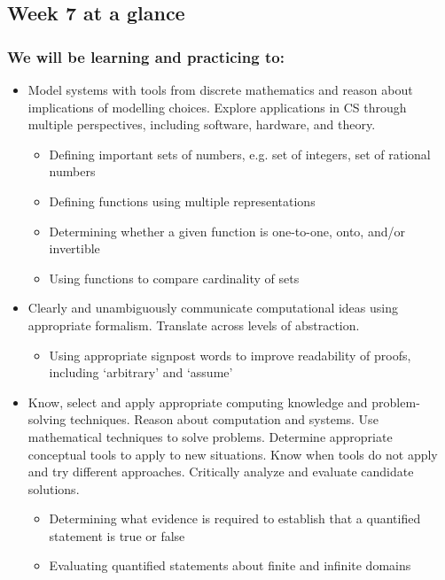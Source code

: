 \newpage

\subsection*{Week 7 at a glance}

\subsubsection*{We will be learning and practicing to:}
\begin{itemize}
\item Model systems with tools from discrete mathematics and reason about implications of modelling choices. Explore applications in CS through multiple perspectives, including software, hardware, and theory.
\begin{itemize}
    \item Defining important sets of numbers, e.g. set of integers, set of rational numbers
    \item Defining functions using multiple representations
    \item Determining whether a given function is one-to-one, onto, and/or invertible
    \item Using functions to compare cardinality of sets
\end{itemize}

\item Clearly and unambiguously communicate computational ideas using appropriate formalism. Translate across levels of abstraction.
\begin{itemize}
    \item Using appropriate signpost words to improve readability of proofs, including `arbitrary' and `assume'
\end{itemize}

\item Know, select and apply appropriate computing knowledge and problem-solving techniques. Reason about computation and systems. Use mathematical techniques to solve problems. Determine appropriate conceptual tools to apply to new situations. Know when tools do not apply and try different approaches. Critically analyze and evaluate candidate solutions.
\begin{itemize}
    \item Determining what evidence is required to establish that a quantified statement is true or false
    \item Evaluating quantified statements about finite and infinite domains
\end{itemize}


\end{itemize}
